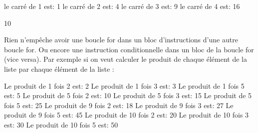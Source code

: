 \documentclass[letterpaper,10pt,french]{sphinxmanual}
\begin{document}
\begin{sphinxVerbatim}[commandchars=\\\{\}]
le carré de 1 est: 1
le carré de 2 est: 4
le carré de 3 est: 9
le carré de 4 est: 16
\end{sphinxVerbatim}

\begin{sphinxVerbatim}[commandchars=\\\{\}]
  
   
      
\end{sphinxVerbatim}

\begin{sphinxVerbatim}[commandchars=\\\{\}]
10
\end{sphinxVerbatim}

\sphinxAtStartPar
Rien n’empêche avoir une boucle for dans un bloc d’instructions d’une autre boucle for. Ou encore une instruction conditionnelle dans un bloc de la boucle for (vice versa). Par exemple si on veut calculer le produit de chaque élément de la liste \sphinxcode{\sphinxupquote{{[}1, 5, 9, 10{]}}} par chaque élément de la liste \sphinxcode{\sphinxupquote{{[}2, 3, 5{]}}}:

\begin{sphinxVerbatim}[commandchars=\\\{\}]
   \PYG{p}{[}   \PYG{p}{]}
       \PYG{p}{[}  \PYG{p}{]}
             
\end{sphinxVerbatim}

\begin{sphinxVerbatim}[commandchars=\\\{\}]
Le produit de 1 fois 2 est: 2
Le produit de 1 fois 3 est: 3
Le produit de 1 fois 5 est: 5
Le produit de 5 fois 2 est: 10
Le produit de 5 fois 3 est: 15
Le produit de 5 fois 5 est: 25
Le produit de 9 fois 2 est: 18
Le produit de 9 fois 3 est: 27
Le produit de 9 fois 5 est: 45
Le produit de 10 fois 2 est: 20
Le produit de 10 fois 3 est: 30
Le produit de 10 fois 5 est: 50
\end{sphinxVerbatim}
\end{document}
